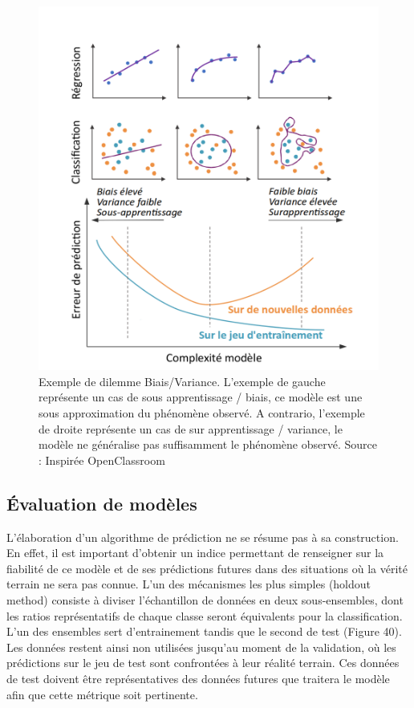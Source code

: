 \begin{figure}[H]
    \centering
    \includegraphics[width=\linewidth]{contents/chapter_3/resources/underfit_overfit.pdf}
    \caption{Exemple de dilemme Biais/Variance. L’exemple de gauche représente un cas de sous apprentissage / biais, ce modèle est une sous approximation du phénomène observé. A contrario, l’exemple de droite représente un cas de sur apprentissage / variance, le modèle ne généralise pas suffisamment le phénomène observé. Source : Inspirée OpenClassroom }
    \label{fig:underfit_overfit}
\end{figure}

\subsection{Évaluation de modèles}
L’élaboration d’un algorithme de prédiction ne se résume pas à sa construction. En effet, il est important d’obtenir un indice permettant de renseigner sur la fiabilité de ce modèle et de ses prédictions futures dans des situations où la vérité terrain ne sera pas connue. L’un des mécanismes les plus simples (holdout method) consiste à diviser l’échantillon de données en deux sous-ensembles, dont les ratios représentatifs de chaque classe seront équivalents pour la classification. L’un des ensembles sert d’entrainement tandis que le second de test (Figure 40). Les données restent ainsi non utilisées jusqu’au moment de la validation, où les prédictions sur le jeu de test sont confrontées à leur réalité terrain. Ces données de test doivent être représentatives des données futures que traitera le modèle afin que cette métrique soit pertinente.

